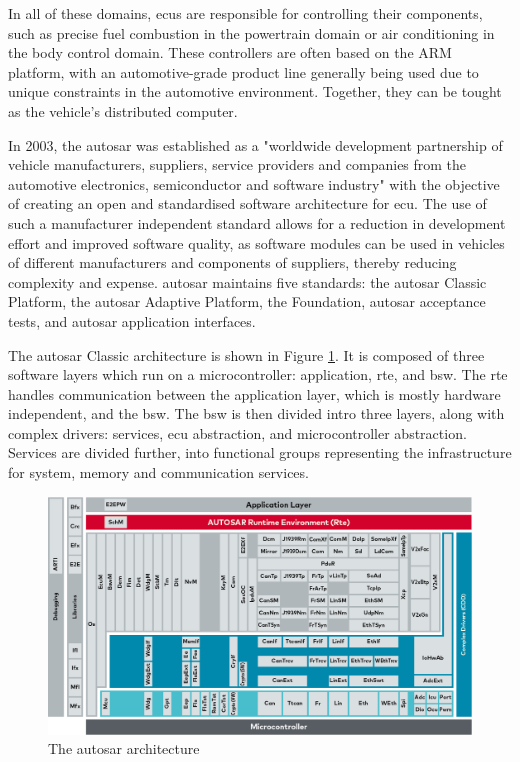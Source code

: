 In all of these domains, \glspl{ecu} are responsible for controlling their components, such as precise fuel combustion in the powertrain domain or air conditioning in the body control domain. These controllers are often based on the ARM platform, with an automotive-grade product line generally being used due to unique constraints in the automotive environment. Together, they can be tought as the vehicle's distributed computer.\par

In 2003, the \gls{autosar} was established as a "worldwide development partnership of vehicle manufacturers, suppliers, service providers and companies from the automotive electronics, semiconductor and software industry" with the objective of creating an open and standardised software architecture for \gls{ecu}. The use of such a manufacturer independent standard allows for a reduction in development effort and improved software quality, as software modules can be used in vehicles of different manufacturers and components of suppliers, thereby reducing complexity and expense. \gls{autosar} maintains five standards: the \gls{autosar} Classic Platform, the \gls{autosar} Adaptive Platform, the Foundation, \gls{autosar} acceptance tests, and \gls{autosar} application interfaces.\par

The \gls{autosar} Classic architecture is shown in Figure \ref{fig:autosar_arch}. It is composed of three software layers which run on a microcontroller: application, \gls{rte}, and \gls{bsw}. The \gls{rte} handles communication between the application layer, which is mostly hardware independent, and the \gls{bsw}. The \gls{bsw} is then divided intro three layers, along with complex drivers: services, \gls{ecu} abstraction, and microcontroller abstraction. Services are divided further, into functional groups representing the infrastructure for system, memory and communication services.

\begin{figure}
    \centering
    \includegraphics[width = \linewidth]{img/parts/introduction/AUTOSAR.png}
    \caption{The \gls{autosar} architecture \citep{autosar_arch}}
    \label{fig:autosar_arch}
\end{figure}

